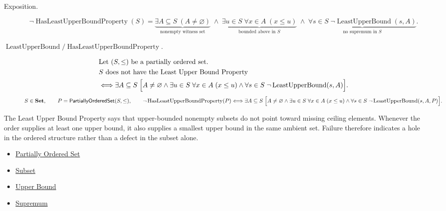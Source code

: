 \begin{remark*}
\begin{description}
  \item[Exposition.]
\[
\neg\operatorname{HasLeastUpperBoundProperty}(S)
=
\underbrace{\exists A\subseteq S\;(A\neq\varnothing)}_{\text{nonempty witness set}}
\;\land\;
\underbrace{\exists u\in S\;\forall x\in A\;(x\le u)}_{\text{bounded above in }S}
\;\land\;
\underbrace{\forall s\in S\;\neg\operatorname{LeastUpperBound}(s,A)}_{\text{no supremum in }S}.
\]


  \item[\(\operatorname{LeastUpperBound} / \operatorname{HasLeastUpperBoundProperty}.\)]
  \[
\begin{aligned}
&\text{Let }(S,\le)\text{ be a partially ordered set}.\\
&S\text{ does not have the Least Upper Bound Property}\\
&\Longleftrightarrow
\exists A\subseteq S\;
\Bigl[
A\neq\varnothing
\land
\exists u\in S\;\forall x\in A\;(x\le u)
\land
\forall s\in S\;\neg\operatorname{LeastUpperBound}(s,A)
\Bigr].
\end{aligned}
\]
\[
S\in\mathbf{Set},\qquad P=\mathsf{PartiallyOrderedSet}(S,\leq),\qquad
\neg\operatorname{HasLeastUpperBoundProperty}(P)\Longleftrightarrow
\exists A\subseteq S\;
\Bigl[
A\neq\varnothing
\land
\exists u\in S\;\forall x\in A\;(x\le u)
\land
\forall s\in S\;\neg\operatorname{LeastUpperBound}(s,A,P)
\Bigr].
\]
\end{description}
\end{remark*}

\begin{remark*}[Interpretation]
The Least Upper Bound Property says that upper-bounded nonempty subsets do not point toward missing ceiling elements. Whenever the order supplies at least one upper bound, it also supplies a smallest upper bound in the same ambient set. Failure therefore indicates a hole in the ordered structure rather than a defect in the subset alone.
\end{remark*}

\begin{dependencies}
\begin{itemize}
  \item \hyperref[def:partially-ordered-set]{Partially Ordered Set}
  \item \hyperref[def:subset]{Subset}
  \item \hyperref[def:real-upper-bound]{Upper Bound}
  \item \hyperref[def:supremum]{Supremum}
\end{itemize}
\end{dependencies}






